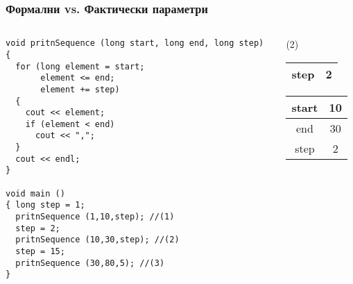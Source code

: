 \documentclass{beamer}
\begin{document}
\begin{frame}[fragile]
\frametitle{Формални vs. Фактически параметри}



\begin{columns}[t]
  \begin{column}{0.75\textwidth}

\begin{lstlisting}
void pritnSequence (long start, long end, long step)
{
  for (long element = start;
       element <= end;
       element += step)
  {
    cout << element;
    if (element < end)
      cout << ",";
  }
  cout << endl;
}

void main ()
{ long step = 1;
  pritnSequence (1,10,step); //(1)
  step = 2;
  pritnSequence (10,30,step); //(2)
  step = 15;
  pritnSequence (30,80,5); //(3)
}
\end{lstlisting}


  \end{column}
  \begin{column}{0.25\textwidth}

    \alert{(2)}

    \begin{tabular}{|c|c|}
    step & 2 \\\hline

    \end{tabular}
    \pause
    \begin{tabular}{|c|c|}
    start & 10 \\\hline
    end & 30 \\\hline
    step & 2 \\\hline

    \end{tabular}
  \end{column}
\end{columns}

\end{frame}
\end{document}
